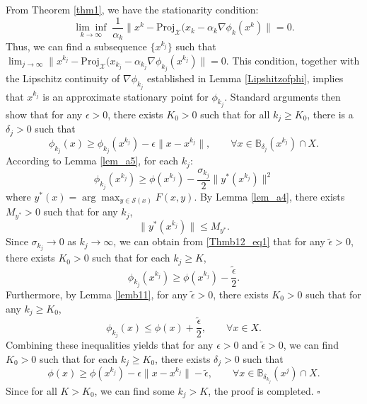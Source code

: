 \documentclass{article}
\newenvironment{proof}[1][Proof]{\par
	\normalfont\topsep6pt\relax
	\trivlist\item[\hskip\labelsep\itshape #1.]\ignorespaces
}{%
	\hfill\ensuremath{\square}\endtrivlist
}
\def\x{x}
\begin{document}
\begin{proof}[Proof of Corollary \ref{thm2}]
From Theorem \ref{thm1}, we have the stationarity condition:
\[
\underset{k \rightarrow \infty}{\lim\inf}\;\frac{1}{\alpha_k}\| x^k - \mathrm{Proj}_{\mathcal{X}}(\x_k-\alpha_k \nabla\phi_{k}(x^k)\| = 0.
\]
Thus, we can find a subsequence $\{x^{k_j}\}$ such that $\lim _{j\to\infty }\| x^{k_j} - \mathrm{Proj}_{\mathcal{X}}(\x_{k_j}-\alpha_{k_j} \nabla\phi_{k_j}(x^{k_j})\| = 0.$ 
This condition, together with the Lipschitz continuity of $\nabla\phi_{k_j}$ established in Lemma \ref{Lipshitzofphi}, 
implies that $x^{k_j}$ is an approximate stationary point for $\phi_{k_j}$. 
Standard arguments then show that for any $\epsilon >0$, there exists $K_0 > 0$ such that for all ${k_j} \ge K_0$, there is a $\delta_{j} > 0$ such that
\[
\phi_{k_j}(x) \ge \phi_{k_j}(x^{k_j}) - \epsilon \|x -x^{k_j}\|, \qquad \forall x \in \mathbb{B}_{\delta_{j}}(x^{k_j}) \cap X.
\]
According to Lemma \ref{lem_a5}, for each ${k_j}$:
      \begin{equation}\label{Thmb12_eq1}
       \phi_{k_j}(x^{k_j}) \ge \phi(x^{k_j})- \frac{\sigma_{k_j}}{2}\|y^*(x^{k_j})\|^2 
      \end{equation}
       where $y^*(x) = \arg\max_{y \in \mathcal{S}(x)}F(x,y)$.
By Lemma \ref{lem_a4}, there exists $M_{y^*} > 0$ such that for any ${k_j}$,
 \[
 \|y^*(x^{k_j})\| \le M_{y^*}.
 \]    
Since $\sigma_{k_j} \rightarrow 0$ as ${k_j} \rightarrow \infty$, we can obtain from \eqref{Thmb12_eq1} that for any $\tilde{\epsilon} >0$, there exists $K_0 > 0$ such that for each ${k_j}\ge K$,
 \[
 \phi_{k_j}(x^{k_j}) \ge \phi(x^{k_j}) - \frac{\tilde{\epsilon}}{2}.
 \]
Furthermore, by Lemma \ref{lemb11}, for any $\tilde\epsilon > 0$, there exists $K_0 > 0$ such that for any ${k_j} \ge K_0$,
\[
\phi_{k_j}(x)\le\phi(x) + \frac{\tilde{\epsilon}}{2}, \qquad \forall x \in X.
\]
Combining these inequalities yields that for any $\epsilon >0$ and $\tilde{\epsilon} >0$, we can find $K_0 > 0$ such that for each ${k_j} \ge K_0$, there exists $\delta_{j} > 0$ such that
\[
\phi(x) \ge \phi(x^{k_j}) - \epsilon \|x -x^{k_j}\| - \tilde{\epsilon}, \qquad \forall x \in \mathbb{B}_{\delta_{k_j}}(x^{j}) \cap X.
\]
Since for all $K>K_0$, we can find some  $k_j>K$, the proof is completed.
\end{proof}
    
    

\end{document}
